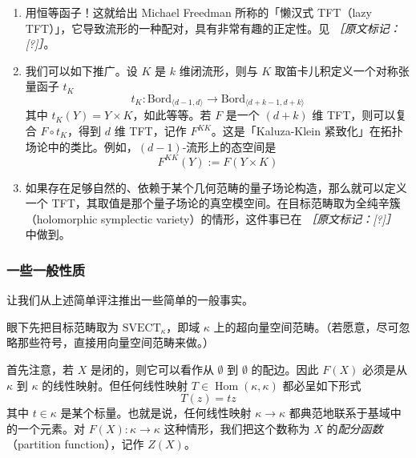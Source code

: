 \begin{enumerate}
  \item 用恒等函子！这就给出 Michael Freedman 所称的「懒汉式 TFT（lazy TFT）」，它导致流形的一种配对，具有非常有趣的正定性。见 {\small\itshape ［原文标记：[?]］}。
  \item 我们可以如下推广。设 $K$ 是 $k$ 维闭流形，则与 $K$ 取笛卡儿积定义一个对称张量函子 $t_K$
\begin{equation}
  t_K:\mathrm{Bord}_{\langle d-1,d\rangle}\to\mathrm{Bord}_{\langle d+k-1,d+k\rangle}
  \tag{5.6}
  \label{eq:5.6}
\end{equation}
其中 $t_K(Y)=Y\times K$，如此等等。若 $F$ 是一个 $(d+k)$ 维 TFT，则可以复合 $F\circ t_K$，得到 $d$ 维 TFT，记作 $F^{KK}$。这是「Kaluza-Klein 紧致化」在拓扑场论中的类比。例如，$(d-1)$-流形上的态空间是
\begin{equation}
  F^{KK}(Y):=F(Y\times K)
  \tag{5.7}
  \label{eq:5.7}
\end{equation}
  \item 如果存在足够自然的、依赖于某个几何范畴的量子场论构造，那么就可以定义一个 TFT，其取值是那个量子场论的真空模空间。在目标范畴取为全纯辛簇（holomorphic symplectic variety）的情形，这件事已在 {\small\itshape ［原文标记：[?]］} 中做到。
\end{enumerate}

\subsubsection{一些一般性质} %

让我们从上述简单评注推出一些简单的一般事实。

眼下先把目标范畴取为 $\mathrm{SVECT}_\kappa$，即域 $\kappa$ 上的超向量空间范畴。（若愿意，尽可忽略那些符号，直接用向量空间范畴来做。）

首先注意，若 $X$ 是闭的，则它可以看作从 $\emptyset$ 到 $\emptyset$ 的配边。因此 $F(X)$ 必须是从 $\kappa$ 到 $\kappa$ 的线性映射。但任何线性映射 $T\in\operatorname{Hom}(\kappa,\kappa)$ 都必呈如下形式
\begin{equation}
  T(z)=tz
  \tag{5.8}
  \label{eq:5.8}
\end{equation}
其中 $t\in\kappa$ 是某个标量。也就是说，任何线性映射 $\kappa\to\kappa$ 都典范地联系于基域中的一个元素。对 $F(X):\kappa\to\kappa$ 这种情形，我们把这个数称为 $X$ 的\emph{配分函数}（partition function），记作 $Z(X)$。

